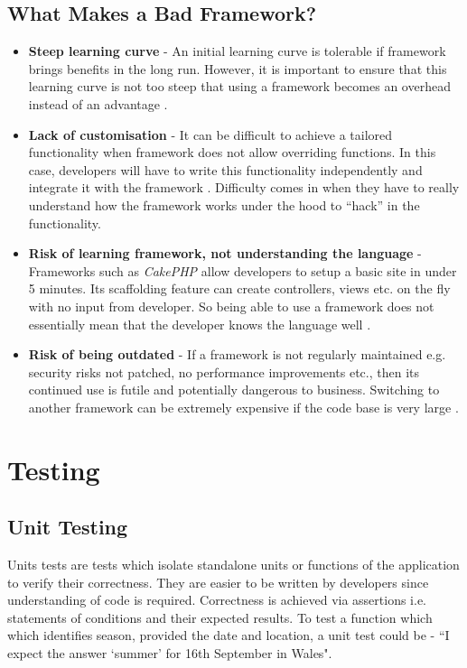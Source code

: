 \subsection{What Makes a Bad Framework?}
\label{subsec:what-makes-a-bad-framework}
\begin{itemize}
 	  \item \textbf{Steep learning curve} - An initial learning curve is tolerable if framework brings benefits in the long run. However, it is important to ensure that this learning curve is not too steep that using a framework becomes an overhead instead of an advantage \cite{OSTraining}.

    \item \textbf{Lack of customisation } - It can be difficult to achieve a tailored functionality when framework does not allow overriding functions. In this case, developers will have to write this functionality independently and integrate it with the framework \cite{Quora}. Difficulty comes in when they have to really understand how the framework works under the hood to “hack” in the functionality.

    \item \textbf{Risk of learning framework, not understanding the language} - Frameworks such as \textit{CakePHP} allow developers to setup a basic site in under 5 minutes. Its scaffolding feature can create controllers, views etc. on the fly with no input from developer. So being able to use a framework does not essentially mean that the developer knows the language well \cite{Vizteams}.

    \item \textbf{Risk of being outdated} - If a framework is not regularly maintained e.g. security risks not patched, no performance improvements etc., then its continued use is futile and potentially dangerous to business. Switching to another framework can be extremely expensive if the code base is very large \cite{Quora}.
\end{itemize}

\section{Testing}
\label{sec:testing}

\subsection{Unit Testing}
\label{subsec:unit-testing}

Units tests are tests which isolate standalone units or functions of the application to verify their correctness. They are easier to be written by developers since understanding of code is required. Correctness is achieved via assertions i.e. statements of conditions and their expected results. To test a function which which identifies season, provided the date and location, a unit test could be - “I expect the answer ‘summer’ for 16th September in Wales".

